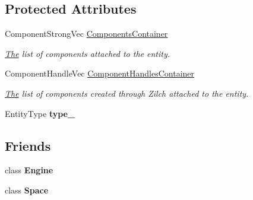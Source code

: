 \subsection*{Protected Attributes}
\begin{DoxyCompactItemize}
\item 
\hypertarget{classDCEngine_1_1Entity_ae50a77dace42749e37323c34b4f09be0}{Component\-Strong\-Vec \hyperlink{classDCEngine_1_1Entity_ae50a77dace42749e37323c34b4f09be0}{Components\-Container}}\label{classDCEngine_1_1Entity_ae50a77dace42749e37323c34b4f09be0}

\begin{DoxyCompactList}\small\item\em \hyperlink{classThe}{The} list of components attached to the entity. \end{DoxyCompactList}\item 
\hypertarget{classDCEngine_1_1Entity_af5401234eb4da2aeab70dee69a92b14f}{Component\-Handle\-Vec \hyperlink{classDCEngine_1_1Entity_af5401234eb4da2aeab70dee69a92b14f}{Component\-Handles\-Container}}\label{classDCEngine_1_1Entity_af5401234eb4da2aeab70dee69a92b14f}

\begin{DoxyCompactList}\small\item\em \hyperlink{classThe}{The} list of components created through Zilch attached to the entity. \end{DoxyCompactList}\item 
\hypertarget{classDCEngine_1_1Entity_a7583c9a51a4c1a032c818d300f9b6ff1}{Entity\-Type {\bfseries type\-\_\-}}\label{classDCEngine_1_1Entity_a7583c9a51a4c1a032c818d300f9b6ff1}

\end{DoxyCompactItemize}
\subsection*{Friends}
\begin{DoxyCompactItemize}
\item 
\hypertarget{classDCEngine_1_1Entity_a3e1914489e4bed4f9f23cdeab34a43dc}{class {\bfseries Engine}}\label{classDCEngine_1_1Entity_a3e1914489e4bed4f9f23cdeab34a43dc}

\item 
\hypertarget{classDCEngine_1_1Entity_a2129e6c0ac73536a2ac4f681dae16947}{class {\bfseries Space}}\label{classDCEngine_1_1Entity_a2129e6c0ac73536a2ac4f681dae16947}

\end{DoxyCompactItemize}
